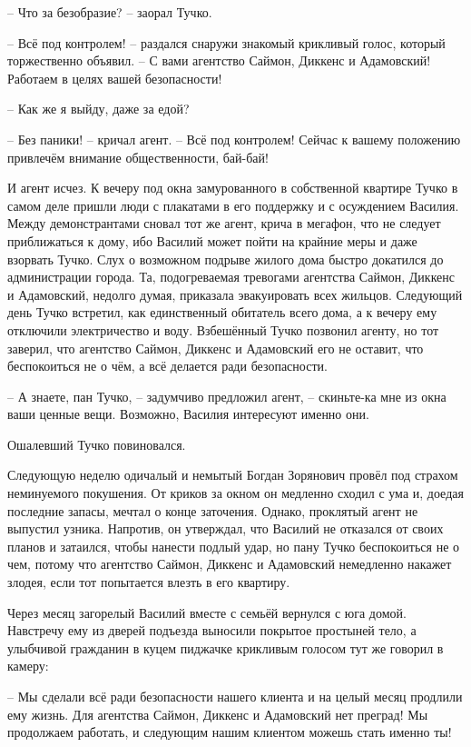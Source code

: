 \begin{itemize}
– Что за безобразие? – заорал Тучко.

– Всё под контролем! – раздался снаружи знакомый крикливый голос, который
торжественно объявил. – С вами агентство Саймон, Диккенс и Адамовский! Работаем
в целях вашей безопасности!

– Как же я выйду, даже за едой?

– Без паники! – кричал агент. – Всё под контролем! Сейчас к вашему положению
привлечём внимание общественности, бай-бай!

И агент исчез. К вечеру под окна замурованного в собственной квартире Тучко в
самом деле пришли люди с плакатами в его поддержку и с осуждением Василия.
Между демонстрантами сновал тот же агент, крича в мегафон, что не следует
приближаться к дому, ибо Василий может пойти на крайние меры и даже взорвать
Тучко. Слух о возможном подрыве жилого дома быстро докатился до администрации
города. Та, подогреваемая тревогами агентства Саймон, Диккенс и Адамовский,
недолго думая, приказала эвакуировать всех жильцов. Следующий день Тучко
встретил, как единственный обитатель всего дома, а к вечеру ему отключили
электричество и воду. Взбешённый Тучко позвонил агенту, но тот заверил, что
агентство Саймон, Диккенс и Адамовский его не оставит, что беспокоиться не о
чём, а всё делается ради безопасности.

– А знаете, пан Тучко, – задумчиво предложил агент, – скиньте-ка мне из окна
ваши ценные вещи. Возможно, Василия интересуют именно они.

Ошалевший Тучко повиновался.

Следующую неделю одичалый и немытый Богдан Зорянович провёл под страхом
неминуемого покушения. От криков за окном он медленно сходил с ума и, доедая
последние запасы, мечтал о конце заточения. Однако, проклятый агент не выпустил
узника. Напротив, он утверждал, что Василий не отказался от своих планов и
затаился, чтобы нанести подлый удар, но пану Тучко беспокоиться не о чем,
потому что агентство Саймон, Диккенс и Адамовский немедленно накажет злодея,
если тот попытается влезть в его квартиру.

Через месяц загорелый Василий вместе с семьёй вернулся с юга домой. Навстречу
ему из дверей подъезда выносили покрытое простыней тело, а улыбчивой гражданин
в куцем пиджачке крикливым голосом тут же говорил в камеру:

– Мы сделали всё ради безопасности нашего клиента и на целый месяц продлили ему
жизнь. Для агентства Саймон, Диккенс и Адамовский нет преград! Мы продолжаем
работать, и следующим нашим клиентом можешь стать именно ты!

\end{itemize} %
